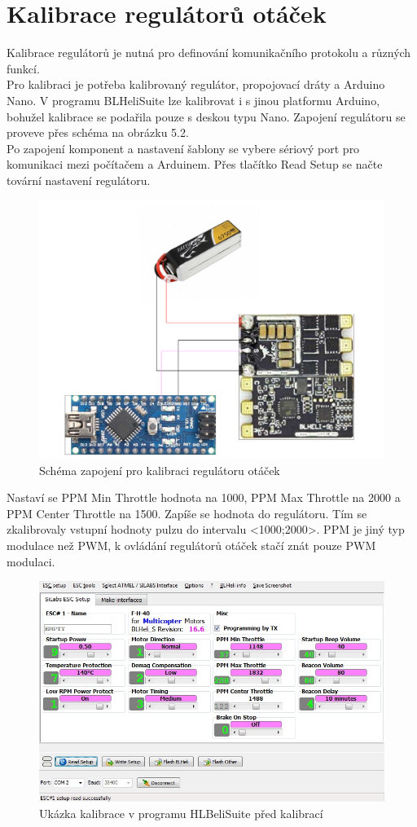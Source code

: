 \section{Kalibrace regulátorů otáček}
Kalibrace regulátorů je nutná pro definování komunikačního protokolu a různých funkcí.\\
Pro kalibraci je potřeba kalibrovaný regulátor, propojovací dráty a Arduino Nano. V programu BLHeliSuite lze kalibrovat i s jinou platformu Arduino, bohužel kalibrace se podařila pouze s deskou typu Nano. Zapojení regulátoru se proveve přes schéma na obrázku 5.2.\\
Po zapojení komponent a nastavení šablony se vybere sériový port pro komunikaci mezi počítačem a Arduinem. Přes tlačítko Read Setup se načte tovární nastavení regulátoru.\cite{blheli}\\
\begin{figure}[H]
	\centering
	\includegraphics[width=12cm]{pictures/esc_calib.pdf}
	\caption{Schéma zapojení pro kalibraci regulátoru otáček}
\end{figure}
Nastaví se PPM Min Throttle hodnota na 1000, PPM Max Throttle na 2000 a PPM Center Throttle na 1500. Zapíše se hodnota do regulátoru. Tím se zkalibrovaly vstupní hodnoty pulzu do intervalu <1000;2000>. PPM je jiný typ modulace než PWM, k ovládání regulátorů otáček stačí znát pouze PWM modulaci.\\

\begin{figure}[H]
	\centering
	\includegraphics[width=12cm]{pictures/esc_calib5.jpg}
	\caption{Ukázka kalibrace v programu HLBeliSuite před kalibrací}
\end{figure}

